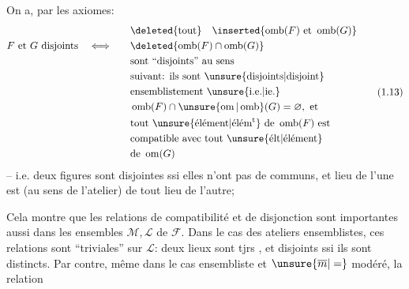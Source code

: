 On a, par les axiomes:
\[
\begin{aligned}
&&&\deleted{\text{tout}}\quad\inserted{\operatorname{omb}(F)\text{ et }\operatorname{omb}(G)}\\
 F\text{ et }G\text{ disjoints}&\quad\Longleftrightarrow\quad&&\deleted{\operatorname{omb}(F)\cap\operatorname{omb}(G)}\\
&&&\text{sont ``disjoints'' au sens}\\
&&&\text{suivant: ils sont \unsure{disjoints|disjoint}}\\
&&&\text{ensemblistement \unsure{i.e.|ie.}}\\
&&&\operatorname{omb}(F)\cap\unsure{\operatorname{om}|\operatorname{omb}}(G)=\varnothing,\ \text{et}\\
&&&\text{tout \unsure{élément|élém\textsuperscript{t}} de }\operatorname{omb}(F)\text{ est}\\
&&&\text{compatible avec tout \unsure{élt|élément}}\\
&&&\text{de }\operatorname{om}(G)
\end{aligned}\tag*{(1.13)}
\]
-- i.e. deux figures sont disjointes ssi elles n'ont pas de  communs, et  lieu de l'une est    (au sens de  l'atelier) de tout lieu de l'autre;

Cela montre que les relations de compatibilité et de disjonction sont importantes aussi dans les  ensembles $\mathcal{M},\mathcal{L}$ de $\mathcal{F}$. Dans le cas des ateliers ensemblistes, ces relations sont ``triviales'' sur $\mathcal{L}$: deux lieux sont tjrs  , et disjoints ssi ils sont distincts. Par contre, même dans le cas ensembliste et $\unsure{\overline m|=}$ modéré, la relation
